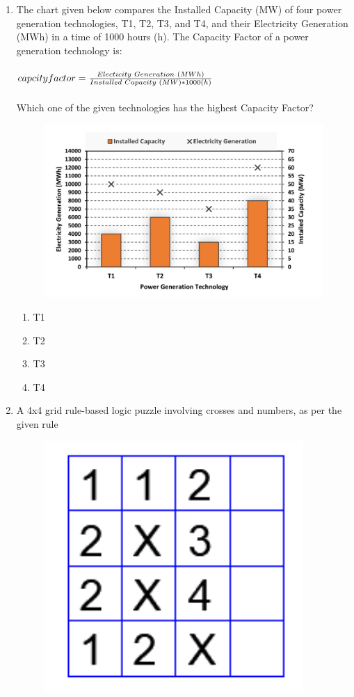 \documentclass{article}
\begin{document}
\begin{enumerate}[leftmargin=*, start=6, label=Q.\arabic*.]
    \item The chart given below compares the Installed Capacity (MW) of four power generation technologies, T1, T2, T3, and T4, and their Electricity Generation (MWh) in a time of 1000 hours (h). The Capacity Factor of a power generation technology is: \\ \\
    $capcity factor=\frac{Electicity \hspace{0.1cm}Generation \hspace{0.1cm} (MWh)}{Installed \hspace{0.1cm} Capacity \hspace{0.1cm} (MW) *1000(h)}$ \\ \\
    Which one of the given technologies has the highest Capacity Factor?

    \begin{figure}[h]
        \centering
        \includegraphics[width=0.4\linewidth]{Figures/asg1 fig1.png}
        \caption{}
    \end{figure}

    \begin{multicols}{4}
    \begin{enumerate}
        \item T1
        \item T2
        \item T3
        \item T4
    \end{enumerate}
    \end{multicols}

    \item A 4x4 grid rule-based logic puzzle involving crosses and numbers, as per the given rule

    \begin{figure}[h]
        \centering
        \includegraphics[width=0.4\linewidth]{Figures/asg1 fig2.png}
        \caption{}
    \end{figure}


\end{enumerate}
\end{document}
